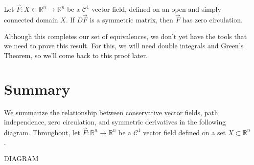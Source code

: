 \documentclass{ximera}
\begin{document}
\begin{proposition}
Let $\vec{F}:X\subset\mathbb{R}^n\rightarrow \mathbb{R}^n$ be a $\mathcal{C}^1$ vector field, defined on an open and simply connected domain $X$. If $D\vec{F}$ is a symmetric matrix, then $\vec{F}$ has zero circulation.
\end{proposition}

Although this completes our set of equivalences, we don't yet have the tools that we need to prove this result. For this, we will need double integrals and Green's Theorem, so we'll come back to this proof later.

\section*{Summary}

We summarize the relationship between conservative vector fields, path independence, zero circulation, and symmetric derivatives in the following diagram. Throughout, let $\vec{F}:\mathbb{R}^n \to \mathbb{R}^n$ be a $\mathcal{C}^1$ vector field defined on a set $X \subset \mathbb{R}^n$.  

DIAGRAM

\end{document}
